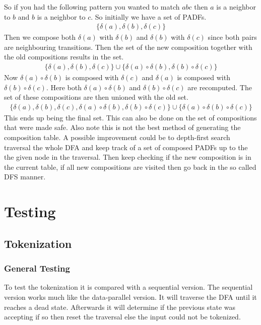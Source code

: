 \documentclass[a4paper,12pt]{article}
\theoremstyle{definition}
\begin{document}
So if you had the following pattern you wanted to match $abc$ then $a$ is a neighbor to $b$ and $b$ is a neighbor to $c$. So initially we have a set of PADFs.
\begin{align*}
  \{\delta(a), \delta(b), \delta(c)\}
\end{align*}
Then we compose both $\delta(a)$ with $\delta(b)$ and $\delta(b)$ with $\delta(c)$ since both pairs are neighbouring transitions. Then the set of the new composition together with the old compositions results in the set.
\begin{align*}
  \{\delta(a), \delta(b), \delta(c)\} \cup \{\delta(a) \circ \delta(b), \delta(b) \circ \delta(c)\}
\end{align*}
Now $\delta(a) \circ \delta(b)$ is composed with $\delta(c)$ and $\delta(a)$ is composed with $\delta(b) \circ \delta(c)$. Here both $\delta(a) \circ \delta(b)$ and $\delta(b) \circ \delta(c)$ are recomputed. The set of these compositions are then unioned with the old set.
\begin{align*}
  \{\delta(a), \delta(b), \delta(c), \delta(a) \circ \delta(b), \delta(b) \circ \delta(c)\} \cup \{\delta(a) \circ \delta(b) \circ \delta(c)\}
\end{align*}
This ends up being the final set. This can also be done on the set of compositions that were made safe. Also note this is not the best method of generating the composition table.  A possible improvement could be to depth-first search traversal the whole DFA and keep track of a set of composed PADFs up to the the given node in the traversal. Then keep checking if the new composition is in the current table, if all new compositions are visited then go back in the so called DFS manner.

\section{Testing}
\subsection{Tokenization}
\subsubsection{General Testing}
To test the tokenization it is compared with a sequential version. The sequential version works much like the data-parallel version. It will traverse the DFA until it reaches a dead state. Afterwards it will determine if the previous state was accepting if so then reset the traversal else the input could not be tokenized.
\end{document}
